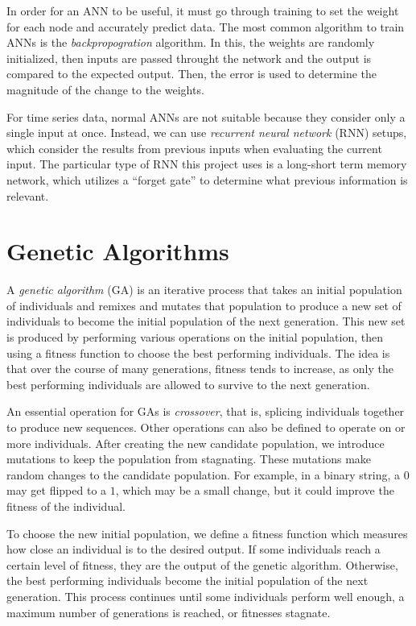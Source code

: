 In order for an ANN to be useful, it must go through training to set the weight for each node and accurately predict data.
The most common algorithm to train ANNs is the \textit{backpropogration} algorithm.
In this, the weights are randomly initialized, then inputs are passed throught the network and the output is compared to the expected output.
Then, the error is used to determine the magnitude of the change to the weights.

For time series data, normal ANNs are not suitable because they consider only a single input at once.
Instead, we can use \textit{recurrent neural network} (RNN) setups, which consider the results from previous inputs when evaluating the current input.
The particular type of RNN this project uses is a long-short term memory network, which utilizes a ``forget gate'' to determine what previous information is relevant.

\section{Genetic Algorithms} \label{bg:ga}

A \textit{genetic algorithm} (GA) is an iterative process that takes an initial population of individuals and remixes and mutates that population to produce a new set of individuals to become the initial population of the next generation.
This new set is produced by performing various operations on the initial population, then using a fitness function to choose the best performing individuals.
The idea is that over the course of many generations, fitness tends to increase, as only the best performing individuals are allowed to survive to the next generation.

An essential operation for GAs is \textit{crossover}, that is, splicing individuals together to produce new sequences.
Other operations can also be defined to operate on or more individuals.
After creating the new candidate population, we introduce mutations to keep the population from stagnating.
These mutations make random changes to the candidate population.
For example, in a binary string, a $0$ may get flipped to a $1$, which may be a small change, but it could improve the fitness of the individual.

To choose the new initial population, we define a fitness function which measures how close an individual is to the desired output.
If some individuals reach a certain level of fitness, they are the output of the genetic algorithm.
Otherwise, the best performing individuals become the initial population of the next generation.
This process continues until some individuals perform well enough, a maximum number of generations is reached, or fitnesses stagnate.

